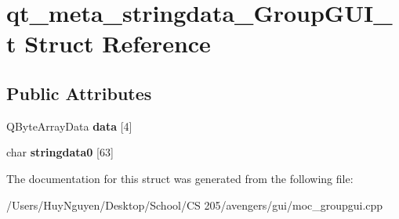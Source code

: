 \hypertarget{structqt__meta__stringdata__GroupGUI__t}{}\section{qt\+\_\+meta\+\_\+stringdata\+\_\+\+Group\+G\+U\+I\+\_\+t Struct Reference}
\label{structqt__meta__stringdata__GroupGUI__t}
\subsection*{Public Attributes}
\begin{DoxyCompactItemize}
\item 
Q\+Byte\+Array\+Data {\bfseries data} \mbox{[}4\mbox{]}\hypertarget{structqt__meta__stringdata__GroupGUI__t_a72fe8a23ac1fd5ee4df45c5e6ef5eca7}{}\label{structqt__meta__stringdata__GroupGUI__t_a72fe8a23ac1fd5ee4df45c5e6ef5eca7}

\item 
char {\bfseries stringdata0} \mbox{[}63\mbox{]}\hypertarget{structqt__meta__stringdata__GroupGUI__t_a4c4f109d7a09853da6c63fee618ee5fc}{}\label{structqt__meta__stringdata__GroupGUI__t_a4c4f109d7a09853da6c63fee618ee5fc}

\end{DoxyCompactItemize}


The documentation for this struct was generated from the following file\+:\begin{DoxyCompactItemize}
\item 
/\+Users/\+Huy\+Nguyen/\+Desktop/\+School/\+C\+S 205/avengers/gui/moc\+\_\+groupgui.\+cpp\end{DoxyCompactItemize}

